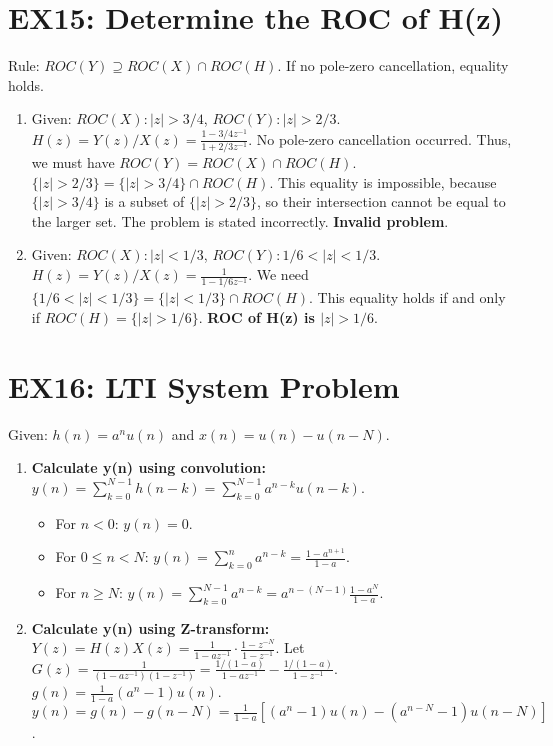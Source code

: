 \documentclass[a4paper,12pt]{article}
\begin{document}
\section*{EX15: Determine the ROC of H(z)}
Rule: $ROC(Y) \supseteq ROC(X) \cap ROC(H)$. If no pole-zero cancellation, equality holds.
\begin{enumerate}
    \item Given: $ROC(X): |z|>3/4$, $ROC(Y): |z|>2/3$.
        $H(z) = Y(z)/X(z) = \frac{1-3/4 z^{-1}}{1+2/3 z^{-1}}$. No pole-zero cancellation occurred.
        Thus, we must have $ROC(Y) = ROC(X) \cap ROC(H)$.
        $\{|z|>2/3\} = \{|z|>3/4\} \cap ROC(H)$.
        This equality is impossible, because $\{|z|>3/4\}$ is a subset of $\{|z|>2/3\}$, so their intersection cannot be equal to the larger set. The problem is stated incorrectly. \textbf{Invalid problem}.
        
    \item Given: $ROC(X): |z|<1/3$, $ROC(Y): 1/6 < |z| < 1/3$.
        $H(z) = Y(z)/X(z) = \frac{1}{1-1/6 z^{-1}}$.
        We need $\{1/6 < |z| < 1/3\} = \{|z|<1/3\} \cap ROC(H)$.
        This equality holds if and only if $ROC(H) = \{|z|>1/6\}$.
        \textbf{ROC of H(z) is $|z|>1/6$}.
\end{enumerate}


\section*{EX16: LTI System Problem}
Given: $h(n) = a^n u(n)$ and $x(n) = u(n) - u(n-N)$.
\begin{enumerate}
    \item \textbf{Calculate y(n) using convolution:}
    $y(n) = \sum_{k=0}^{N-1} h(n-k) = \sum_{k=0}^{N-1} a^{n-k}u(n-k)$.
        \begin{itemize}
            \item For $n < 0$: $y(n)=0$.
            \item For $0 \le n < N$: $y(n) = \sum_{k=0}^{n} a^{n-k} = \frac{1-a^{n+1}}{1-a}$.
            \item For $n \ge N$: $y(n) = \sum_{k=0}^{N-1} a^{n-k} = a^{n-(N-1)}\frac{1-a^N}{1-a}$.
        \end{itemize}
    \item \textbf{Calculate y(n) using Z-transform:}
        $Y(z) = H(z)X(z) = \frac{1}{1-az^{-1}} \cdot \frac{1-z^{-N}}{1-z^{-1}}$.
        Let $G(z) = \frac{1}{(1-az^{-1})(1-z^{-1})} = \frac{1/(1-a)}{1-az^{-1}} - \frac{1/(1-a)}{1-z^{-1}}$.
        $g(n) = \frac{1}{1-a}(a^n - 1)u(n)$.
        $y(n) = g(n) - g(n-N) = \frac{1}{1-a}[(a^n-1)u(n) - (a^{n-N}-1)u(n-N)]$.
\end{enumerate}
\end{document}
